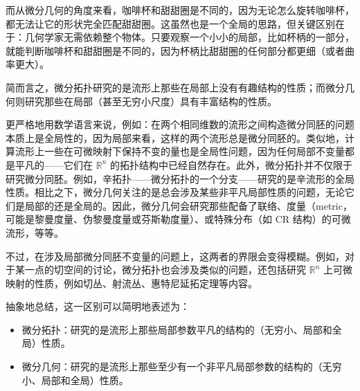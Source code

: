 而从微分几何的角度来看，咖啡杯和甜甜圈是不同的，因为无论怎么旋转咖啡杯，都无法让它的形状完全匹配甜甜圈。这虽然也是一个全局的思路，但关键区别在于：几何学家无需依赖整个物体。只要观察一个小小的局部，比如杯柄的一部分，就能判断咖啡杯和甜甜圈是不同的，因为杯柄比甜甜圈的任何部分都更细（或者曲率更大）。

简而言之，微分拓扑研究的是流形上那些在局部上没有有趣结构的性质；而微分几何则研究那些在局部（甚至无穷小尺度）具有丰富结构的性质。

更严格地用数学语言来说，例如：在两个相同维数的流形之间构造微分同胚的问题本质上是全局性的，因为局部来看，这样的两个流形总是微分同胚的。类似地，计算流形上一些在可微映射下保持不变的量也是全局性问题，因为任何局部不变量都是平凡的——它们在 $\mathbb{R}^n$ 的拓扑结构中已经自然存在。此外，微分拓扑并不仅限于研究微分同胚。例如，辛拓扑——微分拓扑的一个分支——研究的是辛流形的全局性质。相比之下，微分几何关注的是总会涉及某些非平凡局部性质的问题，无论它们是局部的还是全局的。因此，微分几何会研究那些配备了联络、度量（metric，可能是黎曼度量、伪黎曼度量或芬斯勒度量）、或特殊分布（如 CR 结构）的可微流形，等等。

不过，在涉及局部微分同胚不变量的问题上，这两者的界限会变得模糊。例如，对于某一点的切空间的讨论，微分拓扑也会涉及类似的问题，还包括研究 $\mathbb{R}^n$ 上可微映射的性质，例如切丛、射流丛、惠特尼延拓定理等内容。

抽象地总结，这一区别可以简明地表述为：
\begin{itemize}
\item 微分拓扑：研究的是流形上那些局部参数平凡的结构的（无穷小、局部和全局）性质。
\item 微分几何：研究的是流形上那些至少有一个非平凡局部参数的结构的（无穷小、局部和全局）性质。
\end{itemize}
